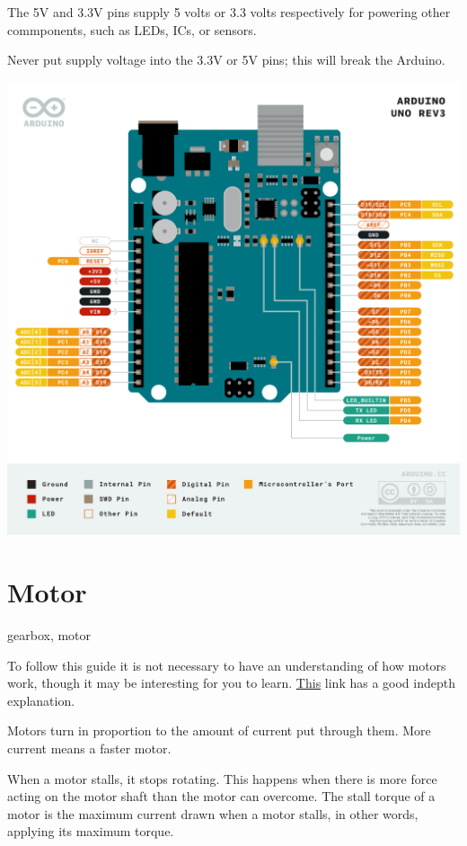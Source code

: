 \documentclass[a4paper,12pt]{article}
\begin{document}
The 5V and 3.3V  pins supply 5 volts or 3.3 volts respectively for powering other commponents, such as LEDs, ICs, or sensors.  

\begin{warningbox}
    Never put supply voltage into the 3.3V or 5V pins; this will break the Arduino. 
\end{warningbox}


\begin{center}
    \includegraphics[width=0.8\linewidth]{Pinout-UNOrev3_latest.png}
    \label{fig:arduino-pinout}
\end{center}





\section{Motor} \label{sec:motor}
gearbox, motor

To follow this guide it is not necessary to have an understanding of how motors work, though it may be interesting for you to learn. \href{https://www.explainthatstuff.com/electricmotors.html}{This} link has a good indepth explanation.


Motors turn in proportion to the amount of current put through them. More current means a faster motor. 

When a motor stalls, it stops rotating. This happens when there is more force acting on the motor shaft than the motor can overcome. The stall torque of a motor is the maximum current drawn when a motor stalls, in other words, applying its maximum torque. \\
\end{document}
